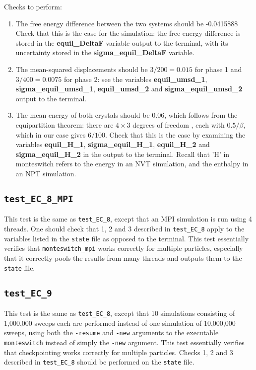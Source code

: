 \documentclass{report}
\begin{document}
Checks to perform:
\begin{enumerate}
\item
The free energy difference between the two systems should be -0.0415888
Check that this is the case for the simulation: the free energy difference is stored in the \textbf{equil\_DeltaF}
variable output to the terminal, with its uncertainty stored in the \textbf{sigma\_equil\_DeltaF} variable. 
\item
The mean-squared displacements should be $3/200=0.015$ for phase 1 and $3/400=0.0075$ for phase 2: see the 
variables \textbf{equil\_umsd\_1}, \textbf{sigma\_equil\_umsd\_1}, \textbf{equil\_umsd\_2} and \textbf{sigma\_equil\_umsd\_2} output to the 
terminal.
\item
The mean energy of both crystals should be 0.06, which follows from the equipartition theorem:
there are $4\times 3$ degrees of freedom , each with $0.5/\beta$, which in our case gives $6/100$. Check that this
is the case by examining the variables \textbf{equil\_H\_1}, \textbf{sigma\_equil\_H\_1}, \textbf{equil\_H\_2} and \textbf{sigma\_equil\_H\_2}
in the output to the terminal. Recall that 'H' in monteswitch refers to the energy in an NVT simulation, and 
the enthalpy in an NPT simulation.
\end{enumerate}


\subsection{\texttt{test\_EC\_8\_MPI}}
This test is the same as \texttt{test\_EC\_8}, except that an MPI simulation is run using 4 threads.  One should check that
1, 2 and 3 described in \texttt{test\_EC\_8} apply to the variables listed in the \texttt{state} file as opposed to the
terminal. This test essentially verifies that \texttt{monteswitch\_mpi} works correctly for multiple particles, especially that it 
correctly pools the results from many threads and outputs them to the \texttt{state} file.


\subsection{\texttt{test\_EC\_9}}
This test is the same as \texttt{test\_EC\_8}, except that 10 simulations consisting of 1,000,000 sweeps each are performed
instead of one simulation of 10,000,000 sweeps, using both the \texttt{-resume} and \texttt{-new} arguments to the executable 
\texttt{monteswitch} instead of simply the \texttt{-new} argument. This test essentially verifies that checkpointing works
correctly for multiple particles. Checks 1, 2 and 3 described in \texttt{test\_EC\_8} should be performed on the \texttt{state} file.
\end{document}
